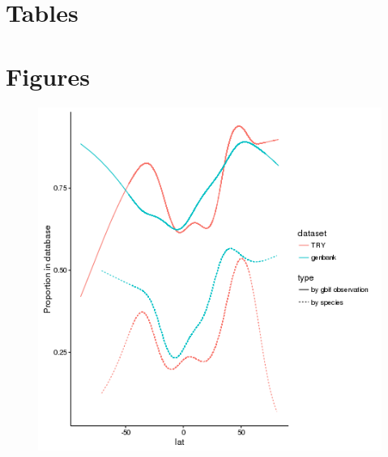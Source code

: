 \documentclass[a4paper,11pt]{article}
\begin{document}
\section{Tables}









\section{Figures}

\begin{figure}[h!]
\centering
  \includegraphics[width=\textwidth]{figures/multi_gam.png}
\end{figure}
\end{document}
